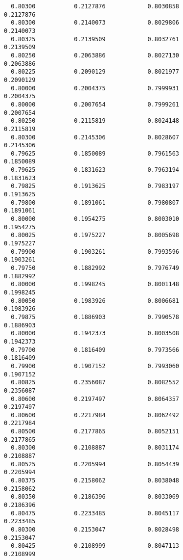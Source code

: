 \documentclass[
  letterpaper,
  DIV=11,
  numbers=noendperiod]{scrartcl}
\begin{document}
\begin{verbatim}
  0.80300           0.2127876            0.8030858            0.2127876     
  0.80300           0.2140073            0.8029806            0.2140073     
  0.80325           0.2139509            0.8032761            0.2139509     
  0.80250           0.2063886            0.8027130            0.2063886     
  0.80225           0.2090129            0.8021977            0.2090129     
  0.80000           0.2004375            0.7999931            0.2004375     
  0.80000           0.2007654            0.7999261            0.2007654     
  0.80250           0.2115819            0.8024148            0.2115819     
  0.80300           0.2145306            0.8028607            0.2145306     
  0.79625           0.1850089            0.7961563            0.1850089     
  0.79625           0.1831623            0.7963194            0.1831623     
  0.79825           0.1913625            0.7983197            0.1913625     
  0.79800           0.1891061            0.7980807            0.1891061     
  0.80000           0.1954275            0.8003010            0.1954275     
  0.80025           0.1975227            0.8005698            0.1975227     
  0.79900           0.1903261            0.7993596            0.1903261     
  0.79750           0.1882992            0.7976749            0.1882992     
  0.80000           0.1998245            0.8001148            0.1998245     
  0.80050           0.1983926            0.8006681            0.1983926     
  0.79875           0.1886903            0.7990578            0.1886903     
  0.80000           0.1942373            0.8003508            0.1942373     
  0.79700           0.1816409            0.7973566            0.1816409     
  0.79900           0.1907152            0.7993060            0.1907152     
  0.80825           0.2356087            0.8082552            0.2356087     
  0.80600           0.2197497            0.8064357            0.2197497     
  0.80600           0.2217984            0.8062492            0.2217984     
  0.80500           0.2177865            0.8052151            0.2177865     
  0.80300           0.2108887            0.8031174            0.2108887     
  0.80525           0.2205994            0.8054439            0.2205994     
  0.80375           0.2158062            0.8038048            0.2158062     
  0.80350           0.2186396            0.8033069            0.2186396     
  0.80475           0.2233485            0.8045117            0.2233485     
  0.80300           0.2153047            0.8028498            0.2153047     
  0.80425           0.2108999            0.8047113            0.2108999     

\end{verbatim}
\end{document}
